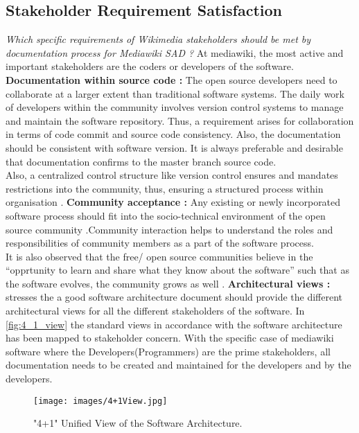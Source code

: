 \subsection{Stakeholder Requirement Satisfaction}
\indent \emph {Which specific requirements of Wikimedia stakeholders should be met by documentation process for Mediawiki SAD ?}
At mediawiki, the most active and important stakeholders are the coders or developers of the software.
\newline
\\\indent \textbf{Documentation within source code : }  The open source developers need to collaborate at a larger extent than traditional software systems. The daily work of developers within the community involves version control systems to manage and maintain the software repository. Thus, a requirement arises for collaboration in terms of code commit and source code consistency. Also, the documentation should be consistent with software version. It is always preferable  and desirable that documentation confirms to the master branch source code.
\\\indent Also, a centralized control structure like version control ensures and mandates restrictions into the community, thus, ensuring a structured process within organisation \cite{Wu2001}.
\newline
\indent \textbf{Community acceptance : }Any existing or newly incorporated software process should fit into the socio-technical environment of the open source community \cite{Mens2011}.Community interaction helps to understand the roles and responsibilities of community members as a part of the software process. 
\\\indent It is also observed that the free/ open source communities believe in the \enquote{opprtunity to learn and share what they know about the software} such that as the software evolves, the community grows as well \cite{Scacchi2006}.
\newline
\indent \textbf{Architectural views : }\cite{BachmannDocumentingSoftware2010} stresses the a good software architecture document should provide the different architectural views for all the different stakeholders of the software. In \autoref{fig:4_1_view} the standard views in accordance with the software architecture has been mapped to stakeholder concern. With the specific case of mediawiki software where the Developers(Programmers) are the prime stakeholders, all documentation needs to be created and maintained for the developers and by the developers. 
\begin{figure}[H]
  \centering
  \texttt{[image: images/4+1View.jpg]}
  \caption["4+1" Unified View of the Software Architecture \cite{bab2009}]{"4+1" Unified View of the Software Architecture.}\label{fig:4_1_view}
\end{figure}
